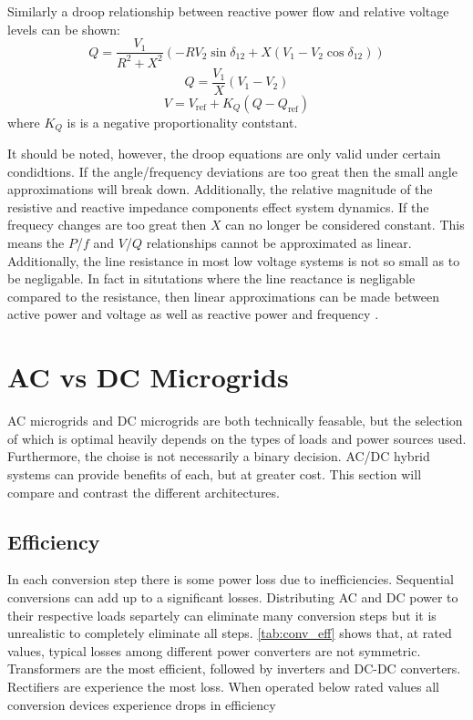 Similarly a droop relationship between reactive power flow and relative voltage levels can be shown:
\begin{equation}
Q = \frac{V_1}{R^2 + X^2} \left( -R V_2 \sin{\delta_{12}} + X \left(V_1 - V_2 \cos{\delta_{12}}\right) \right)
\end{equation}
\begin{equation}
Q = \frac{V_1}{X} \left( V_1 - V_2 \right)
\end{equation}
\begin{equation}
V = V_{\text{ref}} + K_Q \left( Q - Q_{\text{ref}} \right)
\end{equation}
where $K_Q$ is is a negative proportionality contstant. 

It should be noted, however, the droop equations are only valid under certain condidtions. If the angle/frequency deviations are too great then the small angle approximations will break down. Additionally, the relative magnitude of the resistive and reactive impedance components effect system dynamics. If the frequecy changes are too great then $X$ can no longer be considered constant. This means the $P$/$f$ and $V$/$Q$ relationships cannot be approximated as linear. Additionally, the line resistance in most low voltage systems is not so small as to be negligable. In fact in situtations where the line reactance is negligable compared to the resistance, then linear approximations can be made between active power and voltage as well as reactive power and frequency \cite{YunWeiLi2009}.



\section{AC vs DC Microgrids}
AC microgrids and DC microgrids are both technically feasable, but the selection of which is optimal heavily depends on the types of loads and power sources used. Furthermore, the choise is not necessarily a binary decision. AC/DC hybrid systems can provide benefits of each, but at greater cost. This section will compare and contrast the different architectures.

\subsection{Efficiency}
In each conversion step there is some power loss due to inefficiencies. Sequential conversions can add up to a significant losses. Distributing AC and DC power to their respective loads separtely can eliminate many conversion steps but it is unrealistic to completely eliminate all steps. \autoref{tab:conv_eff} shows that, at rated values, typical losses among different power converters are not symmetric. Transformers are the most efficient, followed by inverters and DC-DC converters. Rectifiers are experience the most loss. When operated below rated values all conversion devices experience drops in efficiency

